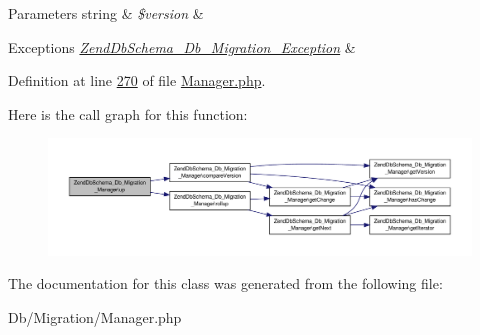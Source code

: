 \begin{DoxyParams}[1]{Parameters}
string & {\em \$version} & \\
\hline
\end{DoxyParams}

\begin{DoxyExceptions}{Exceptions}
{\em \hyperlink{classZendDbSchema__Db__Migration__Exception}{Zend\-Db\-Schema\-\_\-\-Db\-\_\-\-Migration\-\_\-\-Exception}} & \\
\hline
\end{DoxyExceptions}


Definition at line \hyperlink{Manager_8php_source_l00270}{270} of file \hyperlink{Manager_8php_source}{Manager.\-php}.



Here is the call graph for this function\-:\nopagebreak
\begin{figure}[H]
\begin{center}
\leavevmode
\includegraphics[width=350pt]{classZendDbSchema__Db__Migration__Manager_a260901608e7ed2fb5ffef1bf8387e2e9_cgraph}
\end{center}
\end{figure}




The documentation for this class was generated from the following file\-:\begin{DoxyCompactItemize}
\item 
Db/\-Migration/Manager.\-php\end{DoxyCompactItemize}
